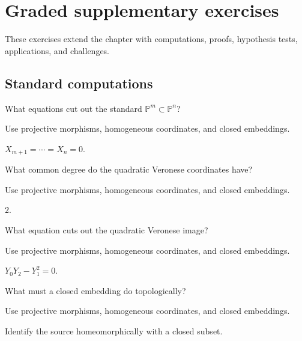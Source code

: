 \section{Graded supplementary exercises}
These exercises extend the chapter with computations, proofs, hypothesis tests, applications, and challenges.

\subsection*{Standard computations}

\begin{exercise}\label{exr:vi38-expand-01}
What equations cut out the standard $\mathbb P^m\subset\mathbb P^n$?
\end{exercise}
\begin{hint}
Use projective morphisms, homogeneous coordinates, and closed embeddings.
\end{hint}
\begin{solution}
$X_{m+1}=\cdots=X_n=0$.
\end{solution}

\begin{exercise}\label{exr:vi38-expand-02}
What common degree do the quadratic Veronese coordinates have?
\end{exercise}
\begin{hint}
Use projective morphisms, homogeneous coordinates, and closed embeddings.
\end{hint}
\begin{solution}
$2$.
\end{solution}

\begin{exercise}\label{exr:vi38-expand-03}
What equation cuts out the quadratic Veronese image?
\end{exercise}
\begin{hint}
Use projective morphisms, homogeneous coordinates, and closed embeddings.
\end{hint}
\begin{solution}
$Y_0Y_2-Y_1^2=0$.
\end{solution}

\begin{exercise}\label{exr:vi38-expand-04}
What must a closed embedding do topologically?
\end{exercise}
\begin{hint}
Use projective morphisms, homogeneous coordinates, and closed embeddings.
\end{hint}
\begin{solution}
Identify the source homeomorphically with a closed subset.
\end{solution}

